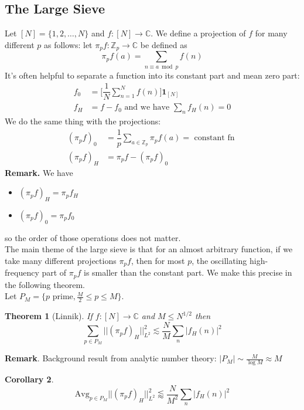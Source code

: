 \documentclass[12pt]{amsart}
\newtheorem{theorem}{Theorem}[section]
\newtheorem{Corollary}[theorem]{Corollary}
\begin{document}
\subsection{The Large Sieve}
Let $[N] = \{ 1, 2, \ldots, N \}$ and $f: [N] \to \mathbb{C}$. We define a projection of $f$ for many different $p$ as follows: let $\pi_p f : \mathbb{Z}_p \to \mathbb{C}$ be defined as 
\begin{equation*}
    \pi_p f(a) = \sum_{n \equiv a \bmod p} f(n)
\end{equation*}
It's often helpful to separate a function into its constant part and mean zero part: 
\begin{align*}
    f_0 &= \Big[ \dfrac{1}{N} \sum_{n = 1}^{N} f(n) \Big] \mathbf{1}_{[N]} \\
    f_H &= f - f_0 \text{ and we have } \sum_{n} f_H(n) = 0
\end{align*}
We do the same thing with the projections:
\begin{align*}
(\pi_p f)_0 &= \dfrac{1}{p} \sum_{a \in \mathbb{Z}_p} \pi_p f(a) = \text{ constant fn } \\
(\pi_p f)_H &= \pi_p f - (\pi_p f)_0
\end{align*}
\textbf{Remark.} We have 
\begin{itemize}
    \item $ (\pi_p f)_H = \pi_p f_H $ 
    \item $(\pi_p f)_0 = \pi_p f_0$
\end{itemize}
so the order of those operations does not matter. \\

The main theme of the large sieve is that for an almost arbitrary function, if we take many different projections $\pi_p f$,  then for most $p$,  the oscillating high-frequency part of $\pi_p f$ is smaller than the constant part. We make this precise in the following theorem. \\

Let $P_M = \{ p \text{ prime}, \frac{M}{2} \leq p \leq M \}$.
\begin{theorem}[Linnik]
    If $f : [N] \to \mathbb{C}$ and $M \leq N^{1/2}$ then 
    \begin{equation*}
        \sum_{p \in P_M} || (\pi_p f)_H ||_{L^2} ^{2} \lesssim \dfrac{N}{M} \sum_{n} |f_H(n)|^2
    \end{equation*}
\end{theorem}
\textbf{Remark}. Background result from analytic number theory: $|P_M| \sim \frac{M}{\log M} \approx M$
\begin{Corollary}
    \begin{equation*}
        \text{Avg}_{p \in P_M} || (\pi_p f)_H ||_{L^2} ^2 \lessapprox\dfrac{N}{M^2} \sum_n |f_H(n)|^2 
    \end{equation*}
\end{Corollary}
\end{document}
